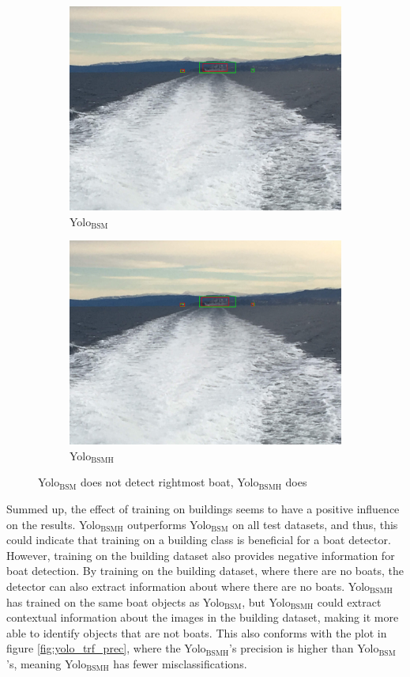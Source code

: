\begin{figure}[h!]
\begin{subfigure}{.5\textwidth}
  \centering
  \includegraphics[width=0.8\linewidth]{results/case_buildings/yolotrf/Yolo2/IMG_2350.jpg}
  \caption{Yolo$_{\text{BSM}}$}
\end{subfigure}%
\begin{subfigure}{.5\textwidth}
  \centering
  \includegraphics[width=.8\linewidth]{results/case_buildings/yolotrf/Yolo3/IMG_2350.jpg}
  \caption{Yolo$_{\text{BSMH}}$}
\end{subfigure}
\caption{Yolo$_{\text{BSM}}$ does not detect rightmost boat, Yolo$_{\text{BSMH}}$ does}
\label{fig:Yolo3_better_trf}
\end{figure}

Summed up, the effect of training on buildings seems to have a positive influence on the results. Yolo$_{\text{BSMH}}$ outperforms Yolo$_{\text{BSM}}$ on all test datasets, and thus, this could indicate that training on a building class is beneficial for a boat detector. However, training on the building dataset also provides negative information for boat detection. By training on the building dataset, where there are no boats, the detector can also extract information about where there are no boats. Yolo$_{\text{BSMH}}$ has trained on the same boat objects as Yolo$_{\text{BSM}}$, but Yolo$_{\text{BSMH}}$ could extract contextual information about the images in the building dataset, making it more able to identify objects that are not boats. This also conforms with the plot in figure \ref{fig:yolo_trf_prec}, where the Yolo$_{\text{BSMH}}$'s precision is higher than Yolo$_{\text{BSM}}$'s, meaning Yolo$_{\text{BSMH}}$ has fewer misclassifications.


